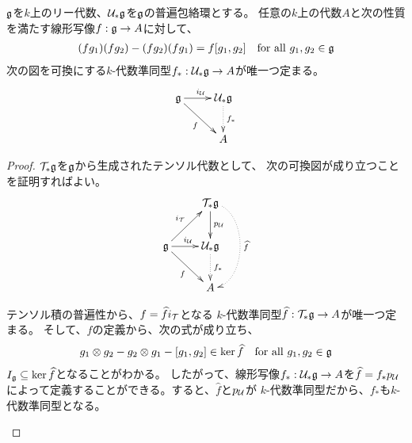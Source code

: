 {	\begin{proposition}[普遍包絡環の普遍性]\label{prop:普遍包絡環の普遍性} %
		${\mathfrak{g}}$を$k$上のリー代数、${{\mathcal{U}}}_*{\mathfrak{g}}$を${\mathfrak{g}}$の普遍包絡環とする。
		任意の$k$上の代数$A$と次の性質を満たす線形写像$f:{\mathfrak{g}}\to A$に対して、
		\begin{equation*}\begin{split}
			(fg_1)(fg_2) - (fg_2)(fg_1) = f[g_1,g_2]
			\quad\text{for all } g_1,g_2\in {\mathfrak{g}}
		\end{split}\end{equation*}
		次の図を可換にする$k$-代数準同型$f_*:{{\mathcal{U}}}_*{\mathfrak{g}}\to A$が唯一つ定まる。
		\begin{equation*}\begin{split}
			\xymatrix{
				\mf{g} \ar[r]^{i_\U} \ar[rd]_{f} & \U_*\mf{g} \ar@{.>}[d]^{f_*} \\
				& A
			}
		\end{split}\end{equation*}
	\end{proposition} %
	\begin{proof} ${{\mathcal{T}}}_*{\mathfrak{g}}$を${\mathfrak{g}}$から生成されたテンソル代数として、
	次の可換図が成り立つことを証明すればよい。
	\begin{equation*}\begin{split}
		\xymatrix{
			& \T_*\mf{g} \ar[d]^{p_\U} \ar@{.>}@(r,r)[dd]^{\widehat{f}} \\
			\mf{g} \ar[ru]^{i_\T} \ar[r]^{i_\U} \ar[rd]_f
				& \U_*\mf{g} \ar@{.>}[d]^{f_*} \\
			& A \\
		}
	\end{split}\end{equation*}
	\begin{description}\setlength{\itemsep}{-1mm} %
		\item[存在] テンソル積の普遍性から、$f=\widehat{f}i_{{\mathcal{T}}}$となる
		$k$-代数準同型$\widehat{f}:{{\mathcal{T}}}_*{\mathfrak{g}}\to A$が唯一つ定まる。
		そして、$f$の定義から、次の式が成り立ち、
		\begin{equation*}\begin{split}
			g_1\otimes g_2 - g_2\otimes g_1 - [g_1,g_2]\in \ker\widehat{f}
			\quad\text{for all } g_1,g_2\in{\mathfrak{g}}
		\end{split}\end{equation*}
		$I_{{\mathfrak{g}}}\subseteq\ker\widehat{f}$となることがわかる。
		したがって、線形写像$f_*:{{\mathcal{U}}}_*{\mathfrak{g}}\to A$を$\widehat{f}=f_*p_{{\mathcal{U}}}$
		によって定義することができる。すると、$\widehat{f}$と$p_{{\mathcal{U}}}$が
		$k$-代数準同型だから、$f_*$も$k$-代数準同型となる。

\end{description}
\end{proof}}
